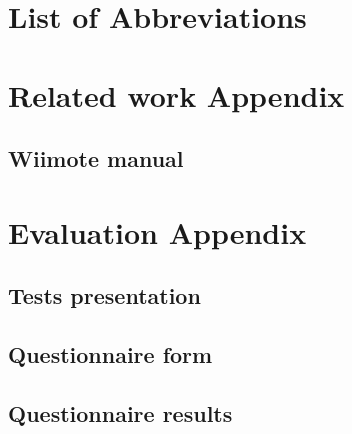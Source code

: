 




\setcounter{page}{1}





\acresetall

\newpage
\tableofcontents

\newpage
{}
\listoffigures

\newpage
{}
\listoftables 

\newpage
{}
\chapter*{List of Abbreviations}


\acresetall

\cleardoublepage
\setcounter{page}{1}


\appendix
\chapter{Related work Appendix}
	\section{Wiimote manual}\label{appendix:Wiimote manual}
	
\chapter{Evaluation Appendix}
	\section{Tests presentation}\label{appendix:Tests presentation}
	
	\section{Questionnaire form}\label{appendix:questionnaire}
	
	
	\section{Questionnaire results}\label{appendix:questionnaireResults}
	
	



